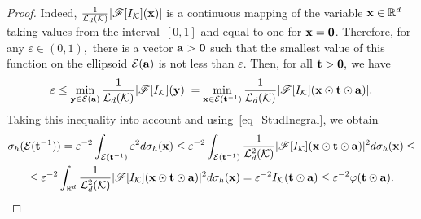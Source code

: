 \documentclass[12pt]{article}
\begin{document}
\begin{proof}
	
Indeed, $\frac{1}{\mathcal{L}_d(\mathcal{K})}|\mathscr{F}[I_{\mathcal{K}}]({\bf x})|$ is a continuous mapping of the variable ${{\bf x}\in\mathbb{R}^d}$ taking values from the interval~$[0,1]$ and equal to one for ${{\bf x}=\bf0}$. Therefore, for any ${\varepsilon\in(0,1)},$ there is a vector ${{\bf a}>\bf0}$ such that the smallest value of this function on the ellipsoid ${\mathcal{E}({\bf a})}$ is not less than ${\varepsilon}.$
Then, for all ${{\bf t}>\bf0},$ we have
$$
\varepsilon\leq\min\limits_{{\bf y}\in \mathcal{E}({\bf a})}\frac{1}{\mathcal{L}_d(\mathcal{K})}|\mathscr{F}[I_{\mathcal{K}}]({\bf y})|=
\min\limits_{{\bf x}\in \mathcal{E}({\bf t}^{-1})}\frac{1}{\mathcal{L}_d(\mathcal{K})}|\mathscr{F}[I_{\mathcal{K}}]({\bf x}\odot{\bf t}\odot{\bf a})|.
$$	
Taking this inequality into account and using~\eqref{eq_StudInegral}, we obtain
\begin{multline*}
\sigma_h(\mathcal{E}({\bf t}^{-1}))=\varepsilon^{-2}\int_{\mathcal{E}({\bf t}^{-1})}\varepsilon^2 d\sigma_h({\bf x})\leq\varepsilon^{-2}\int_{\mathcal{E}({\bf t}^{-1})}\frac{1}{\mathcal{L}^2_d(\mathcal{K})}|\mathscr{F}[I_{\mathcal{K}}]({\bf x}\odot{\bf t}\odot{\bf a})|^2d\sigma_h({\bf x})\leq\\
\leq\varepsilon^{-2}\int_{\mathbb{R}^d}\frac{1}{\mathcal{L}^2_d(\mathcal{K})}|\mathscr{F}[I_{\mathcal{K}}]({\bf x}\odot{\bf t}\odot{\bf a})|^2d\sigma_h({\bf x})=\varepsilon^{-2}I_{\mathcal{K}}({\bf t}\odot{\bf a})\leq\varepsilon^{-2}\varphi({\bf t}\odot{\bf a}).
\end{multline*}
\end{proof}
\end{document}
